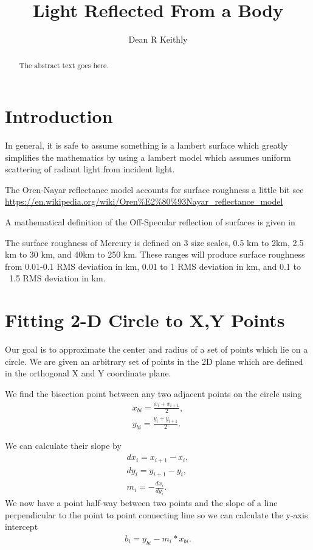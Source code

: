 \documentclass{article}
\begin{document}
\title{Light Reflected From a Body}
\author{Dean R Keithly}

\maketitle

\begin{abstract}
The abstract text goes here.
\end{abstract}

\section{Introduction}
In general, it is safe to assume something is a lambert surface which greatly simplifies the mathematics by using a lambert model which assumes uniform scattering of radiant light from incident light. \cite{Oren}

The Oren-Nayar reflectance model accounts for surface roughness a little bit see \url{https://en.wikipedia.org/wiki/Oren%E2%80%93Nayar_reflectance_model}


A mathematical definition of the Off-Specular reflection of surfaces is given in \cite{Torrance1966}


The surface roughness of Mercury is defined on 3 size scales, 0.5 km to 2km, 2.5 km to 30 km, and 40km to 250 km. These ranges will produce surface roughness from 0.01-0.1 RMS deviation in km, 0.01 to 1 RMS deviation in km, and 0.1 to ~1.5 RMS deviation in km. \cite{Susorney2017}




\section{Fitting 2-D Circle to X,Y Points}
Our goal is to approximate the center and radius of a set of points which lie on a circle.
We are given an arbitrary set of points in the 2D plane which are defined in the orthogonal X and Y coordinate plane.

We find the bisection point between any two adjacent points on the circle using
\begin{align*}
x_{bi} = \frac{x_i+x_{i+1}}{2},\\
y_{bi} = \frac{y_i+y_{i+1}}{2}.
\end{align*}

We can calculate their slope by
\begin{align*}
dx_i = x_{i+1} - x_i,\\
dy_i = y_{i+1} - y_i,\\
m_i = -\frac{dx_i}{dy_i}.
\end{align*}
We now have a point half-way between two points and the slope of a line perpendicular to the point to point connecting line so we can calculate the y-axis intercept
\begin{align*}
b_i = y_{bi} - m_i*x_{bi}.
\end{align*}
\end{document}
